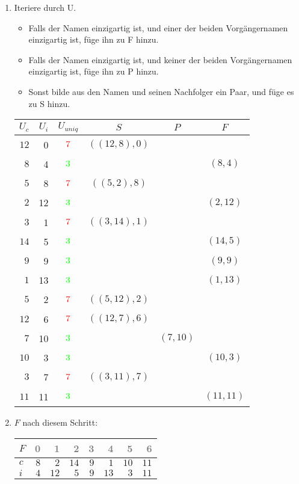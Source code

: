 \begin{enumerate}
\item 
Iteriere durch U.
\begin{itemize}
\item Falls der Namen einzigartig ist, und einer der beiden Vorgängernamen einzigartig ist, füge ihn zu F hinzu.
\item Falls der Namen einzigartig ist, und keiner der beiden Vorgängernamen einzigartig ist, füge ihn zu P hinzu.
\item Sonst bilde aus den Namen und seinen Nachfolger ein Paar, und füge es zu S hinzu.
\end{itemize}

\begin{center}
\small\begin{tabular}{rrcccc}
\toprule 
 $U_c$ & $U_i$ & $U_{uniq}$ &     $S$      &   $P$   &   $F$   \\
\midrule 
$12$ & 0 & $$\xmarkc$$ & $((12, 8), 0)$ &       &       \\
$ 8$ & 4 & $$\cmarkc$$  &            &       & $( 8, 4)$\\
$ 5$ & 8 & $$\xmarkc$$ & $(( 5, 2), 8)$ &       &       \\
$ 2$ & 12 & $$\cmarkc$$  &            &       & $( 2,12)$\\
$ 3$ & 1 & $$\xmarkc$$ & $(( 3,14), 1)$ &       &       \\
$14$ & 5 & $$\cmarkc$$  &            &       & $(14, 5)$\\
$ 9$ & 9 & $$\cmarkc$$  &            &       & $( 9, 9)$\\
$ 1$ & 13 & $$\cmarkc$$  &            &       & $( 1,13)$\\
$ 5$ & 2 & $$\xmarkc$$ & $(( 5,12), 2)$ &       &       \\
$12$ & 6 & $$\xmarkc$$ & $((12, 7), 6)$ &       &       \\
$ 7$ & 10 & $$\cmarkc$$  &            & $( 7,10)$ &       \\
$10$ & 3 & $$\cmarkc$$  &            &       & $(10, 3)$\\
$ 3$ & 7 & $$\xmarkc$$ & $(( 3,11), 7)$ &       &       \\
$11$ & 11 & $$\cmarkc$$  &            &       & $(11,11)$\\
\bottomrule 
\end{tabular}
\end{center}
\item 
$F$ nach diesem Schritt:
\begin{center}
\small\begin{tabular}{lrrrrrrr}
    \toprule 
    $F$ & \textcolor{gray}{0} & \textcolor{gray}{1} & \textcolor{gray}{2} & \textcolor{gray}{3} & \textcolor{gray}{4} & \textcolor{gray}{5} & \textcolor{gray}{6}\\
    \midrule 
    $c$ & $8$ & $2$ & $14$ & $9$ & $1$ & $10$ & $11$ \\
    $i$ & $4$ & $12$ & $5$ & $9$ & $13$ & $3$ & $11$ \\
    \bottomrule 
\end{tabular}
\end{center}


\end{enumerate}
